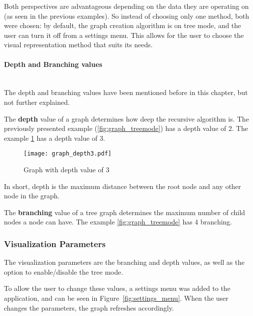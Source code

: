       Both perspectives are advantageous depending on the data they are operating on (as seen in the previous examples).
      So instead of choosing only one method, both were chosen: by default, the graph creation algorithm is on tree mode, and the user can turn it off from a settings menu.
      This allows for the user to choose the visual representation method that suits its needs.

      \paragraph{Depth and Branching values} \hfill \\
      The depth and branching values have been mentioned before in this chapter, but not further explained.

      The \textbf{depth} value of a graph determines how deep the recursive algorithm is.
      The previously presented example (\ref{fig:graph_treemode}) has a depth value of 2.
      The example \ref{fig:graph_depth3} has a depth value of 3.

      \begin{figure}[hb]
        \begin{center}
          \texttt{[image: graph\_depth3.pdf]}
        \end{center}
        \caption{Graph with depth value of 3}
        \label{fig:graph_depth3}
      \end{figure}
      In short, depth is the maximum distance between the root node and any other node in the graph.

      The \textbf{branching} value of a tree graph determines the maximum number of child nodes a node can have.
      The example \ref{fig:graph_treemode} has 4 branching.


    \subsubsection{Visualization Parameters} %
    \label{ssub:visualization_parameters}
    
    The visualization parameters are the branching and depth values, as well as the option to enable/disable the tree mode.

    To allow the user to change these values, a settings menu was added to the application, and can be seen in Figure~\ref{fig:settings_menu}.
    When the user changes the parameters, the graph refreshes accordingly.


